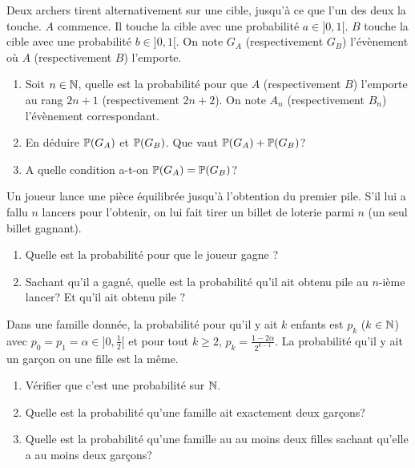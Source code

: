 \begin{exercise}
	Deux archers tirent alternativement sur une cible, jusqu'à ce que l'un des
	deux la touche. $A$ commence. Il touche la cible avec une probabilité
	$a\in]0,1[$. $B$ touche la cible avec une probabilité $b\in]0,1[$. On note
	$G_{A}$ (respectivement $G_{B}$) l'évènement où $A$ (respectivement $B$)
	l'emporte.
	\begin{enumerate}
		\item
		Soit $n\in\N$, quelle est la probabilité pour que $A$ (respectivement $B$)
		l'emporte au rang $2n+1$ (respectivement $2n+2$). On note $A_{n}$
		(respectivement $B_{n}$) l'évènement correspondant.
		\item
		En déduire $\P(G_{A})$ et $\P(G_{B})$. Que vaut $\P(G_{A})+\P(G_{B})$?
		\item A quelle condition a-t-on $\P(G_{A})=\P(G_{B})$?
	\end{enumerate}
\end{exercise}

\begin{exercise}
	Un joueur lance une pièce équilibrée jusqu'à l'obtention du premier pile. S'il
	lui a fallu $n$ lancers pour l'obtenir, on lui fait tirer un billet de loterie
	parmi $n$ (un seul billet gagnant).
	\begin{enumerate}
		\item
		Quelle est la probabilité pour que le joueur gagne ?
		\item
		Sachant qu'il a gagné, quelle est la probabilité qu'il ait obtenu pile au
		$n$-ième lancer? Et qu'il ait obtenu pile ?
	\end{enumerate}
\end{exercise}

\begin{exercise}
	Dans une famille donnée, la probabilité pour qu'il y ait $k$ enfants est
	$p_{k}$ ($k\in\N$) avec $p_{0}=p_{1}=\alpha\in]0,\frac{1}{2}[$ et pour tout
	$k\geqslant2$, $p_{k}=\frac{1-2\alpha}{2^{k-1}}$. La probabilité qu'il y ait
	un garçon ou une fille est la même.
	\begin{enumerate}
		\item
		Vérifier que c'est une probabilité sur $\N$.
		\item
		Quelle est la probabilité qu'une famille ait exactement deux garçons?
		\item
		Quelle est la probabilité qu'une famille au au moins deux filles sachant
		qu'elle a au moins deux garçons?
	\end{enumerate}
\end{exercise}

